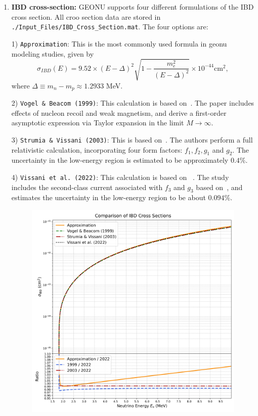 \begin{enumerate}
\begin{figure}[H]
						\end{figure}
					\item \textbf{IBD cross-section:} GEONU supports four different formulations of the IBD cross section. All croo section data are stored in \texttt{./Input\_Files/IBD\_Cross\_Section.mat}. The four options are: \par
					1) \texttt{Approximation}: This is the most commonly used formula in geonu modeling studies, given by				
						\begin{equation}
							\sigma_{IBD}(E)
							= 9.52 \times (E - \Delta)^2 \sqrt{1 - \frac{m_e^2}{(E - \Delta)^2}} \times 10^{-44} \text{cm}^2,
						\end{equation}
					where $\Delta \equiv m_n - m_p \approx 1.2933$ MeV.\par
					2) \texttt{Vogel \& Beacom (1999)}: This calculation is based on~\cite{IBD-1999}. The paper includes effects of nucleon recoil and weak magnetism, and derive a first-order asymptotic expression via Taylor expansion in the limit $M\rightarrow \infty$.\par
					3) \texttt{Strumia \& Vissani (2003)}: This is based on~\cite{IBD-2003}. The authors perform a full relativistic calculation, incorporating four form factors: $f_1, f_2, g_1$ and $g_2$. The uncertainty in the low-energy region is estimated to be approximately $0.4\%$.\par
					4) \texttt{Vissani et al. (2022)}: This calculation is based on ~\cite{IBD-2022}. The study includes the second-class current associated with $f_3$ and $g_3$ based on~\cite{IBD-2003}, and estimates the uncertainty in the low-energy region to be about $0.094\%$.
						\begin{figure}[H]
							\centering
							\includegraphics[scale = 0.5]{./Pics/Comparison_of_All_Computed_IBD_Cross_Section.jpg}
						\end{figure}
				\end{enumerate}

